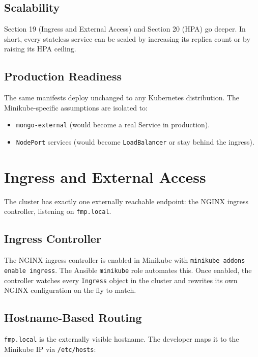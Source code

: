 \documentclass[11pt,a4paper]{article}
\begin{document}
\subsection{Scalability}
Section 19 (Ingress and External Access) and Section 20 (HPA) go
deeper.  In short, every stateless service can be scaled by
increasing its replica count or by raising its HPA ceiling.

\subsection{Production Readiness}
The same manifests deploy unchanged to any Kubernetes distribution.
The Minikube-specific assumptions are isolated to:

\begin{itemize}[leftmargin=*]
  \item \texttt{mongo-external} (would become a real Service in
        production).
  \item \texttt{NodePort} services (would become \texttt{LoadBalancer}
        or stay behind the ingress).
\end{itemize}

\section{Ingress and External Access}

The cluster has exactly one externally reachable endpoint: the NGINX
ingress controller, listening on \texttt{fmp.local}.

\subsection{Ingress Controller}
The NGINX ingress controller is enabled in Minikube with
\texttt{minikube addons enable ingress}.  The Ansible
\texttt{minikube} role automates this.  Once enabled, the controller
watches every \texttt{Ingress} object in the cluster and rewrites its
own NGINX configuration on the fly to match.

\subsection{Hostname-Based Routing}
\texttt{fmp.local} is the externally visible hostname.  The developer
maps it to the Minikube IP via \texttt{/etc/hosts}:
\end{document}
